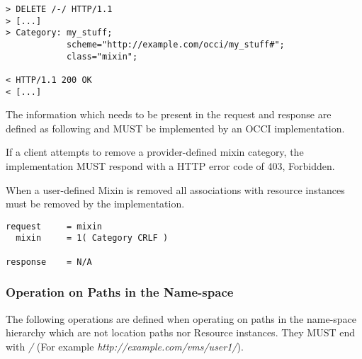 \documentclass[10pt,a4paper]{article}
\begin{document}
\begin{description}
\begin{verbatim}
> DELETE /-/ HTTP/1.1
> [...]
> Category: my_stuff; 
            scheme="http://example.com/occi/my_stuff#"; 
            class="mixin";

< HTTP/1.1 200 OK
< [...]
\end{verbatim}

    The information which needs to be present in the request and
    response are defined as following and MUST be implemented by an
    OCCI implementation.
    
    If a client attempts to remove a provider-defined mixin category, the implementation
    MUST respond with a HTTP error code of 403, Forbidden.
    
    When a user-defined Mixin is removed all associations with resource instances
    must be removed by the implementation.

\begin{verbatim}
request     = mixin
  mixin     = 1( Category CRLF )

response    = N/A
\end{verbatim}

\end{description}

\subsubsection{Operation on Paths in the Name-space}

The following operations are defined when operating on paths in the
name-space hierarchy which are not location paths nor Resource
instances. They MUST end with \emph{/} (For example
\emph{http://example.com/vms/user1/}).
\end{document}
